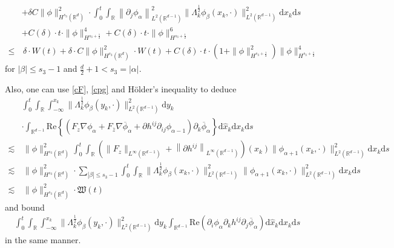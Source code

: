 \documentclass[10pt,twoside,a4paper]{article}
\numberwithin{equation}{section}\allowdisplaybreaks
\def\leq{\leqslant}
\begin{document}
\begin{align}
	&+\delta C \|\phi\|_{H^{s_3}(\mathbb{R}^d)}^2\cdot  \int_0^t\int_{\mathbb{R}}  \left\| \partial_j \phi_{\alpha }\right\|_{L^2(\mathbb{R}^{d-1})}^2 \|\Lambda_k^{\frac 12}\phi_{\beta}(x_k,\cdot)\|^2_{L^2(\mathbb{R}^{d-1})}   \mathrm{d} x_k \mathrm{d} s\nonumber\\
	&+ C(\delta) \cdot t\cdot\|\phi\|_{H^{s_3+\frac 12}}^4+ C(\delta) \cdot t\cdot\|\phi\|_{H^{s_3+\frac 12}}^6 \nonumber\\
\leq&\,  \delta\cdot W (t)+\delta \cdot C\|\phi\|_{H^{s_3}(\mathbb{R}^d)}^2\cdot W (t)+ C(\delta) \cdot t\cdot\left(1+\|\phi\|_{H^{s_3+\frac 12}}^2\right)\|\phi\|_{H^{s_3+\frac 12}}^4 \nonumber
\end{align}
for $|\beta| \leq s_3-1 $ and $ \frac{d}{2}+1<s_3=|\alpha| $. 




Also, one can use \eqref{cF}, \eqref{cpg} and H\"older's inequality to deduce
\begin{align}   \label{cener_c1_5}
	&\int_0^t	\int_{\mathbb{R}} \int_{-\infty}^{x_k} \|\Lambda_k^{\frac 12}\phi_{\beta}(y_k,\cdot)\|^2_{L^2(\mathbb{R}^{d-1})}\mathrm{d} y_k\nonumber\\
 &\cdot\int_{\mathbb{R}^{d-1}} \mathrm{Re}\left\{\left( F_z\nabla \phi_\alpha+F_{\overline{z}}\nabla \overline{\phi}_\alpha+\partial h^{ij}\partial_{ij } \phi_{\alpha -1}\right) \partial_k \overline{\phi}_\alpha \right\}  \mathrm{d} \hat{x}_k  \mathrm{d} x_k \mathrm{d} s\nonumber\\
	\lesssim &\,\|\phi\|_{H^{s_3}(\mathbb{R}^d)}^2 \int_0^t	\int_{\mathbb{R}}  \left( 	\|F_z\|_{L^\infty(\mathbb{R}^{d-1})}+\left\|	\partial h^{ij} \right\|_{L^\infty(\mathbb{R}^{d-1})}\right) (x_k)\|\phi_{\alpha +1} (x_k,\cdot)\|^2_{L^{2}(\mathbb{R}^{d-1})}\mathrm{d} x_k \mathrm{d} s\\
	\lesssim &\,\|\phi\|_{H^{s_3}(\mathbb{R}^d)}^2  \cdot \sum_{|\beta|\leq s_3-1}  \int_0^t	\int_{\mathbb{R}}   \| \Lambda_k^{\frac 12}\phi_{\beta}(x_k,\cdot)\|_{L^2(\mathbb{R}^{d-1})}^2  \|\phi_{\alpha +1} (x_k,\cdot)\|^2_{L^{2}(\mathbb{R}^{d-1})}\mathrm{d} x_k \mathrm{d} s\nonumber\\
	\lesssim &\,\|\phi\|_{H^{s_3}(\mathbb{R}^d)}^2\cdot\mathfrak{W} (t)\nonumber
\end{align}
and bound
\begin{align*}
	\int_0^t	\int_{\mathbb{R}} \int_{-\infty}^{x_k} \|\Lambda_k^{\frac 12}\phi_{\beta}(y_k,\cdot)\|^2_{L^2(\mathbb{R}^{d-1})}\mathrm{d} y_k\int_{\mathbb{R}^{d-1}}  \mathrm{Re}\left(\partial_{i} \phi_{\alpha }  \partial_k h^{ij} \partial_j \overline{\phi}_{\alpha }\right) \mathrm{d} \hat{x}_k  \mathrm{d} x_k \mathrm{d} s 
\end{align*}  
in the same manner.
\end{document}
